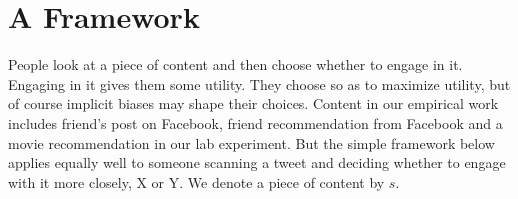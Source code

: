 \documentclass[12pt,letterpaper]{article}
\begin{document}


\section{A Framework}
People look at a piece of content and then choose whether to engage in it. Engaging in it gives them some utility. They choose so as to maximize utility, but of course implicit biases may shape their choices. Content in our empirical work includes friend's post on Facebook, friend recommendation from Facebook and a movie recommendation in our lab experiment. But the simple framework below applies equally well to someone scanning a tweet and deciding whether to engage with it more closely, X or Y. We denote a piece of content by $s$. 
\end{document}
